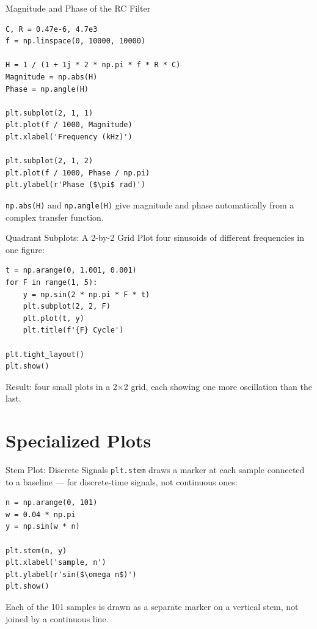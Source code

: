 \documentclass[9pt,aspectratio=169,xcolor=table]{beamer}
\begin{document}
\begin{frame}[fragile]{Magnitude and Phase of the RC Filter}
    \leavevmode
\begin{lstlisting}
C, R = 0.47e-6, 4.7e3
f = np.linspace(0, 10000, 10000)

H = 1 / (1 + 1j * 2 * np.pi * f * R * C)
Magnitude = np.abs(H)
Phase = np.angle(H)

plt.subplot(2, 1, 1)
plt.plot(f / 1000, Magnitude)
plt.xlabel('Frequency (kHz)')

plt.subplot(2, 1, 2)
plt.plot(f / 1000, Phase / np.pi)
plt.ylabel(r'Phase ($\pi$ rad)')
\end{lstlisting}

    \vspace{1mm}
    {\small \texttt{np.abs(H)} and \texttt{np.angle(H)} give magnitude
    and phase automatically from a complex transfer function.}
\end{frame}

\begin{frame}[fragile]{Quadrant Subplots: A 2-by-2 Grid}
    \leavevmode
    Plot four sinusoids of different frequencies in one figure:

\begin{lstlisting}
t = np.arange(0, 1.001, 0.001)
for F in range(1, 5):
    y = np.sin(2 * np.pi * F * t)
    plt.subplot(2, 2, F)
    plt.plot(t, y)
    plt.title(f'{F} Cycle')

plt.tight_layout()
plt.show()
\end{lstlisting}

    \vspace{1mm}
    {\small Result: four small plots in a 2$\times$2 grid, each showing
    one more oscillation than the last.}
\end{frame}

\section{Specialized Plots}

\begin{frame}[fragile]{Stem Plot: Discrete Signals}
    \leavevmode
    \texttt{plt.stem} draws a marker at each sample connected to a
    baseline --- for \alert{discrete-time} signals, not continuous ones:

\begin{lstlisting}
n = np.arange(0, 101)
w = 0.04 * np.pi
y = np.sin(w * n)

plt.stem(n, y)
plt.xlabel('sample, n')
plt.ylabel(r'sin($\omega n$)')
plt.show()
\end{lstlisting}

    \vspace{1mm}
    {\small Each of the 101 samples is drawn as a separate marker on a
    vertical stem, not joined by a continuous line.}
\end{frame}
\end{document}
